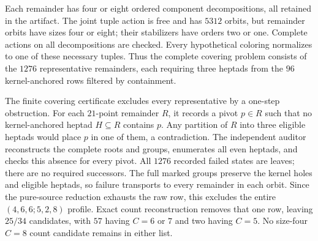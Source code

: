 Each remainder has four or eight ordered component decompositions,
all retained in the artifact. The joint tuple action is free and
has $5312$ orbits, but remainder orbits have sizes four or eight;
their stabilizers have orders two or one. Complete actions on all
decompositions are checked. Every hypothetical coloring normalizes
to one of these necessary tuples. Thus the complete covering
problem consists of the $1276$ representative remainders, each
requiring three heptads from the $96$ kernel-anchored rows filtered
by containment.

The finite covering certificate excludes every representative by
a one-step obstruction. For each $21$-point remainder $R$, it
records a pivot $p\in R$ such that no kernel-anchored heptad
$H\subseteq R$ contains $p$. Any partition of $R$ into three
eligible heptads would place $p$ in one of them, a contradiction.
The independent auditor reconstructs the complete roots and groups,
enumerates all even heptads, and checks this absence for every pivot.
All $1276$ recorded failed states are leaves; there are no required
successors. The full marked groups preserve the kernel holes and
eligible heptads, so failure transports to every remainder in each
orbit. Since the pure-source reduction exhausts the raw row, this
excludes the entire $(4,6,6;5,2,8)$ profile. Exact count reconstruction
removes that one row, leaving $25/34$ candidates, with $57$ having
$C=6$ or $7$ and two having $C=5$. No size-four $C=8$ count
candidate remains in either list.

